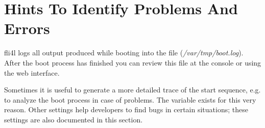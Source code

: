 
\section{Hints To Identify Problems And Errors}

fli4l logs all output produced while booting into the file
(\emph{/var/tmp/boot.log}). After the boot process has finished you can
review this file at the console or using the web interface.

Sometimes it is useful to generate a more detailed trace of the start sequence, 
e.g. to analyze the boot process in case of problems.
The variable  exists for this very reason. Other settings
help developers to find bugs in certain situations; these settings are also
documented in this section.

